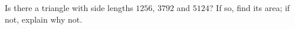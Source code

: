 Is there a triangle with side lengths $1256$, $3792$ and $5124$? If so, find its area; if not, explain why not.
